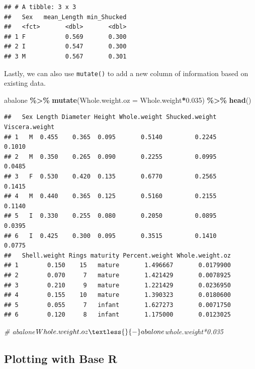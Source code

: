 \documentclass[
]{book}
\newenvironment{Shaded}{\begin{snugshade}}{\end{snugshade}}
\newcommand{\AttributeTok}[1]{\textcolor[rgb]{0.13,0.29,0.53}{#1}}
\newcommand{\CommentTok}[1]{\textcolor[rgb]{0.56,0.35,0.01}{\textit{#1}}}
\newcommand{\FloatTok}[1]{\textcolor[rgb]{0.00,0.00,0.81}{#1}}
\newcommand{\FunctionTok}[1]{\textcolor[rgb]{0.13,0.29,0.53}{\textbf{#1}}}
\newcommand{\NormalTok}[1]{#1}
\newcommand{\SpecialCharTok}[1]{\textcolor[rgb]{0.81,0.36,0.00}{\textbf{#1}}}
\begin{document}
\begin{verbatim}
## # A tibble: 3 x 3
##   Sex   mean_Length min_Shucked
##   <fct>       <dbl>       <dbl>
## 1 F           0.569       0.300
## 2 I           0.547       0.300
## 3 M           0.567       0.301
\end{verbatim}

Lastly, we can also use \texttt{mutate()} to add a new column of information based on existing data.

\begin{Shaded}
\begin{Highlighting}[]
\NormalTok{abalone }\SpecialCharTok{\%\textgreater{}\%} 
  \FunctionTok{mutate}\NormalTok{(}\AttributeTok{Whole.weight.oz =}\NormalTok{ Whole.weight}\SpecialCharTok{*}\FloatTok{0.035}\NormalTok{) }\SpecialCharTok{\%\textgreater{}\%} 
  \FunctionTok{head}\NormalTok{()}
\end{Highlighting}
\end{Shaded}

\begin{verbatim}
##   Sex Length Diameter Height Whole.weight Shucked.weight Viscera.weight
## 1   M  0.455    0.365  0.095       0.5140         0.2245         0.1010
## 2   M  0.350    0.265  0.090       0.2255         0.0995         0.0485
## 3   F  0.530    0.420  0.135       0.6770         0.2565         0.1415
## 4   M  0.440    0.365  0.125       0.5160         0.2155         0.1140
## 5   I  0.330    0.255  0.080       0.2050         0.0895         0.0395
## 6   I  0.425    0.300  0.095       0.3515         0.1410         0.0775
##   Shell.weight Rings maturity Percent.weight Whole.weight.oz
## 1        0.150    15   mature       1.496667       0.0179900
## 2        0.070     7   mature       1.421429       0.0078925
## 3        0.210     9   mature       1.221429       0.0236950
## 4        0.155    10   mature       1.390323       0.0180600
## 5        0.055     7   infant       1.627273       0.0071750
## 6        0.120     8   infant       1.175000       0.0123025
\end{verbatim}

\begin{Shaded}
\begin{Highlighting}[]
\CommentTok{\# abalone$Whole.weight.oz \textless{}{-} abalone$whole.weight*0.035}
\end{Highlighting}
\end{Shaded}

\subsection{Plotting with Base R}\label{plotting-with-base-r}
\end{document}
